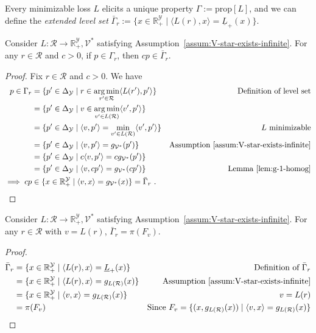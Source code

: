\documentclass[twoside,11pt]{article}
\newcommand{\reals}{\mathbb{R}}
\newcommand{\prop}[1]{\mathrm{prop}[#1]}
\newcommand{\simplex}{\Delta_\Y}
\newcommand{\R}{\mathcal{R}}
\newcommand{\V}{\mathcal{V}}
\newcommand{\Y}{\mathcal{Y}}
\newcommand{\risk}[1]{\underline{#1}}
\newcommand{\inprod}[2]{\langle #1, #2 \rangle}%
\newcommand{\hyp}{\mathrm{hypo}}
\DeclareMathOperator*{\argmin}{arg\,min}
\begin{document}
Every minimizable loss $L$ elicits a unique property $\Gamma := \prop{L}$, and we can define the \emph{extended level set} $\bar \Gamma_r := \{x \in \reals^\Y_+ \mid \inprod{L(r)}{x} = \risk L_+(x)\}$.

\begin{lemma}\label{lem:levelset-to-extended-levelset}
	Consider $L: \R \to \reals^\Y_+, \V^*$ satisfying Assumption~\ref{assum:V-star-exists-infinite}.
	For any $r \in \R$ and $c > 0$, if $p \in \Gamma_r$, then $cp \in \bar \Gamma_r$. 
\end{lemma}
\begin{proof}
	Fix $r \in \R$ and $c > 0$.
	We have
	\begin{align*}
	p \in \Gamma_r
	&= \{p' \in \simplex \mid r \in \argmin_{r' \in \R} \inprod{L(r')}{p'} \} & \text {Definition of level set} \\
	&= \{p' \in \simplex \mid v \in \argmin_{v' \in L(\R)} \inprod{v'}{p'} \} &  \\
	&= \{p' \in \simplex \mid \inprod{v}{p'} = \min_{v' \in L(\R)} \inprod{v'}{p'} \} & \text {$L$ minimizable} \\
	&= \{p' \in \simplex \mid \inprod{v}{p'} = g_{\V^*}(p') \} & \text {Assumption~\ref{assum:V-star-exists-infinite}} \\
	&= \{p' \in \simplex \mid c \inprod{v}{p'} = c g_{\V^*}(p') \} &  \\
	&= \{p' \in \simplex \mid  \inprod{v}{cp'} = g_{\V^*}(cp') \} & \text {Lemma~\ref{lem:g-1-homog}} \\
	\implies cp
	&\in \{x \in \reals^\Y_+ \mid \inprod{v}{x} = g_{\V^*}(x)\} = \bar \Gamma_r~.~
	\end{align*}
\end{proof}

\begin{lemma}\label{lem:extended-levelset-equals-projected-face}
	Consider $L : \R \to \reals^\Y_+, \V^*$ satisfying Assumption~\ref{assum:V-star-exists-infinite}.
	For any $r\in \R$ with $v = L(r)$, $\bar \Gamma_r = \pi(F_v)$.  
\end{lemma}
\begin{proof}
	\begin{align*}
	\bar \Gamma_r
	&= \{x \in \reals^\Y_+ \mid \inprod{L(r)}{x} = \risk L_+(x)\} & \text{Definition of $\bar \Gamma_r$}\\
	&= \{x \in \reals^\Y_+ \mid \inprod{L(r)}{x} = g_{L(\R)}(x)\} & \text{Assumption~\ref{assum:V-star-exists-infinite}}\\
	&= \{x \in \reals^\Y_+ \mid \inprod{v}{x} = g_{L(\R)}(x)\} & \text{$v = L(r)$}\\
	&= \pi(F_v) & \text{Since $F_v = \{(x,g_{L(\R)}(x)) \mid \inprod{v}{x} = g_{L(\R)}(x)\}$}\\
	\end{align*}
\end{proof}
\end{document}
